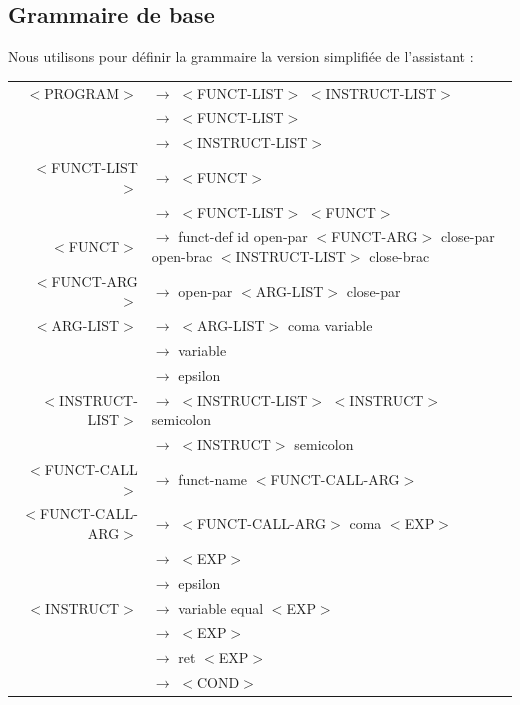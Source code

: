 \documentclass[a4paper,10pt]{article}
\begin{document}
	\subsection{Grammaire de base}
	
	Nous utilisons pour définir la grammaire la version simplifiée de l'assistant : \\
	
	
\hspace{-3.0cm}\begin{tabular}{rl}
$<$PROGRAM$>$		& $\rightarrow$ $<$FUNCT-LIST$>$ $<$INSTRUCT-LIST$>$\\
					& $\rightarrow$ $<$FUNCT-LIST$>$\\
					& $\rightarrow$ $<$INSTRUCT-LIST$>$\\
					
					
$<$FUNCT-LIST$>$	& $\rightarrow$ $<$FUNCT$>$ \\
					& $\rightarrow$ $<$FUNCT-LIST$>$ $<$FUNCT$>$\\
					
$<$FUNCT$>$			& $\rightarrow$ funct-def id open-par $<$FUNCT-ARG$>$ close-par open-brac $<$INSTRUCT-LIST$>$ close-brac \\


					
$<$FUNCT-ARG$>$		& $\rightarrow$ open-par $<$ARG-LIST$>$ close-par\\

$<$ARG-LIST$>$		& $\rightarrow$ $<$ARG-LIST$>$ coma variable \\ 
					& $\rightarrow$ variable\\ 
					& $\rightarrow$ epsilon \\

$<$INSTRUCT-LIST$>$	& $\rightarrow$ $<$INSTRUCT-LIST$>$ $<$INSTRUCT$>$ semicolon\\
					& $\rightarrow$ $<$INSTRUCT$>$ semicolon\\
					
$<$FUNCT-CALL$>$	& $\rightarrow$ funct-name $<$FUNCT-CALL-ARG$>$\\

$<$FUNCT-CALL-ARG$>$& $\rightarrow$ $<$FUNCT-CALL-ARG$>$ coma $<$EXP$>$\\
					& $\rightarrow$ $<$EXP$>$\\
					& $\rightarrow$ epsilon\\

$<$INSTRUCT$>$		& $\rightarrow$ variable equal $<$EXP$>$\\
					& $\rightarrow$ $<$EXP$>$\\
					& $\rightarrow$ ret $<$EXP$>$\\
					& $\rightarrow$ $<$COND$>$\\
					

\end{tabular}
\end{document}

